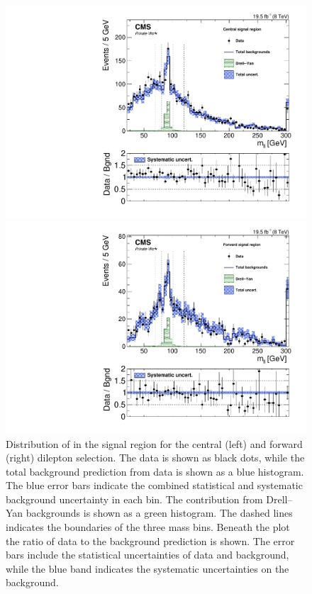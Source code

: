 \begin{figure}[htbp]
\centering
\begin{minipage}[t]{0.49\textwidth}
  \includegraphics[width=\textwidth]{plots/results/mllResult_SignalCentral_Full2012_SF.pdf}
\end{minipage}
\begin{minipage}[t]{0.49\textwidth}
\includegraphics[width=\textwidth]{plots/results/mllResult_SignalForward_Full2012_SF.pdf}
\end{minipage}

\caption{Distribution of \mll in the signal region for the central (left) and forward (right) dilepton selection. The data is shown as black dots, while the total background prediction from data is shown as a blue histogram. The blue error bars indicate the combined statistical and systematic background uncertainty in each bin. The contribution from Drell--Yan backgrounds is shown as a green histogram. The dashed lines indicates the boundaries of the three mass bins. Beneath the plot the ratio of data to the background prediction is shown. The error bars include the statistical uncertainties of data and background, while the blue band indicates the systematic uncertainties on the background. }
\label{fig:resultsCC}
\end{figure} 

